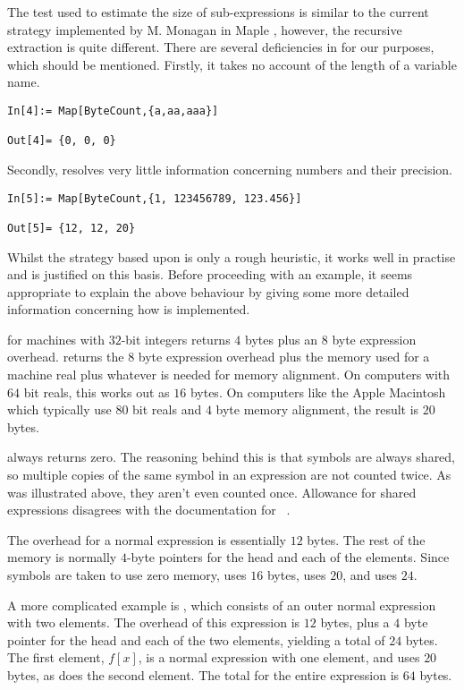 \documentclass [12pt,twoside]{article}
\begin{document}
The test used to estimate the size of sub-expressions is similar to the current strategy
implemented by M. Monagan in Maple \cite{maple}, however, the recursive extraction is
quite different. There are several deficiencies in  for our purposes, which
should be mentioned. Firstly, it takes no account of the length of a variable name.
\begin{verbatim}
In[4]:= Map[ByteCount,{a,aa,aaa}]

Out[4]= {0, 0, 0}
\end{verbatim}
Secondly,  resolves very little information concerning numbers and
their precision.
\begin{verbatim}
In[5]:= Map[ByteCount,{1, 123456789, 123.456}]

Out[5]= {12, 12, 20}
\end{verbatim}
Whilst the strategy based upon  is only a rough heuristic,
it works well in practise and is justified on this basis. Before proceeding with an
example, it seems appropriate to explain the above behaviour by giving some more
detailed information concerning how  is implemented.

 for machines with $32$-bit integers returns
$4$ bytes plus an $8$ byte expression overhead. 
returns the $8$ byte expression overhead plus the memory used for a
machine real plus whatever is needed for memory alignment. On computers
with $64$ bit reals, this works out as $16$ bytes. On computers like the
Apple Macintosh which typically use $80$ bit reals and $4$ byte memory alignment,
the result is $20$ bytes.

 always returns zero.  The reasoning behind this
is that symbols are always shared, so multiple copies of the same symbol in an
expression are not counted twice. As was illustrated above, they aren't even counted once.
Allowance for shared expressions disagrees with the documentation for
~\cite{mmabook}.

The overhead for a normal expression is essentially $12$ bytes. The rest of the
memory is normally $4$-byte pointers for the head and each of the elements. Since
symbols are taken to use zero memory,  uses $16$ bytes,
 uses $20$, and  uses $24$.

A more complicated example is , which  consists of an outer
normal expression with two elements.  The overhead of this expression is $12$
bytes, plus a $4$ byte pointer for the head and each of the two elements,
yielding a total of $24$ bytes.  The first element, $f[x]$, is a normal
expression with one element, and uses $20$ bytes, as does the
second element. The total for the entire expression is $64$ bytes.
\end{document}
